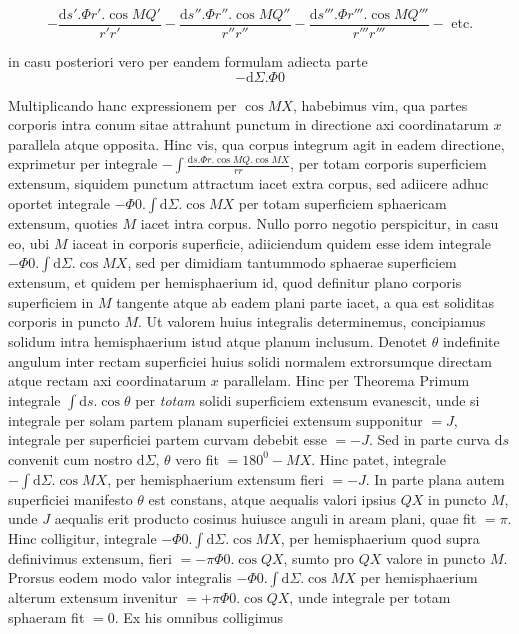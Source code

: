 \[
-\frac{\mathrm{d}s'.\Phi r'.\cos MQ'}{r'r'}-\frac{\mathrm{d}s''.\Phi r''.\cos MQ''}{r''r''}-\frac{\mathrm{d}s'''.\Phi r'''.\cos MQ'''}{r'''r'''}-\text{ etc.}
\]
\par
in casu posteriori vero per eandem formulam adiecta parte
\[
-\mathrm{d}\Sigma.\Phi0
\]
\par
Multiplicando hanc expressionem per $\cos MX$, habebimus vim, qua partes corporis intra conum sitae attrahunt punctum in directione axi coordinatarum $x$ parallela atque opposita. Hinc vis, qua corpus integrum agit in eadem directione, exprimetur per integrale $-\int\frac{\mathrm{d}s.\Phi r.\cos MQ.\cos MX}{rr}$, per totam corporis superficiem extensum, siquidem punctum attractum iacet extra corpus, sed adiicere adhuc oportet integrale $-\Phi0.\int\mathrm{d}\Sigma.\cos MX$ per totam superficiem sphaericam extensum, quoties $M$ iacet intra corpus. Nullo porro negotio perspicitur, in casu eo, ubi $M$ iaceat in corporis superficie, adiiciendum quidem esse idem integrale $-\Phi0.\int\mathrm{d}\Sigma.\cos MX$, sed per dimidiam tantummodo sphaerae superficiem extensum, et quidem per hemisphaerium id, quod definitur plano corporis superficiem in $M$ tangente atque ab eadem plani parte iacet, a qua est soliditas corporis in puncto $M$. Ut valorem huius integralis determinemus, concipiamus solidum intra hemisphaerium istud atque planum inclusum. Denotet $\theta$ indefinite angulum inter rectam superficiei huius solidi normalem extrorsumque directam atque rectam axi coordinatarum $x$ parallelam. Hinc per Theorema Primum integrale $\int\mathrm{d}s.\cos\theta$ per \textit{totam} solidi superficiem extensum evanescit, unde si integrale per solam partem planam superficiei extensum supponitur $=J$, integrale per superficiei partem curvam debebit esse $=-J$. Sed in parte curva $\mathrm{d}s$ convenit cum nostro $\mathrm{d}\Sigma$, $\theta$ vero fit $=180^0-MX$. Hinc patet, integrale $-\int\mathrm{d}\Sigma.\cos MX$, per hemisphaerium extensum fieri $=-J$. In parte plana autem superficiei manifesto $\theta$ est constans, atque aequalis valori ipsius $QX$ in puncto $M$, unde $J$ aequalis erit producto cosinus huiusce anguli in aream plani, quae fit $=\pi$. Hinc colligitur, integrale $-\Phi0.\int\mathrm{d}\Sigma.\cos MX$, per hemisphaerium quod supra definivimus extensum, fieri $=-\pi\Phi0.\cos QX$, sumto pro $QX$ valore in puncto $M$. Prorsus eodem modo valor integralis $-\Phi0.\int\mathrm{d}\Sigma.\cos MX$ per hemisphaerium alterum extensum invenitur $=+\pi\Phi0.\cos QX$, unde integrale per totam sphaeram fit $=0$. Ex his omnibus colligimus
